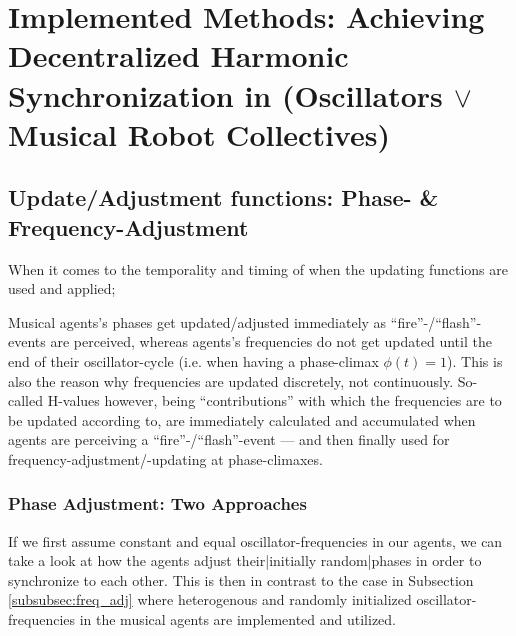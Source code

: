 	
\section{Implemented Methods: Achieving Decentralized Harmonic Synchronization in (Oscillators $\vee$ Musical Robot Collectives)}
\label{sec:methods}
	
	
	\subsection{Update/Adjustment functions: Phase- \& Frequency-Adjustment}
	\label{subsec:update_functions}
	
	When it comes to the temporality and timing of when the updating functions are used and applied;
	
	Musical agents's phases get updated/adjusted immediately as ``fire''-/``flash''-events are perceived, whereas agents's frequencies do not get updated until the end of their oscillator-cycle (i.e. when having a phase-climax $\phi(t)=1$). This is also the reason why frequencies are updated discretely, not continuously. So-called H-values however, being ``contributions'' with which the frequencies are to be updated according to, are immediately calculated and accumulated when agents are perceiving a ``fire''-/``flash''-event — and then finally used for frequency-adjustment/-updating at phase-climaxes.
	
	
	
	
	
	
	
	
	
		\subsubsection{Phase Adjustment: Two Approaches}
		\label{subsubsec:phase_adj}
			If we first assume constant and equal oscillator-frequencies in our agents, we can take a look at how the agents adjust their|initially random|phases in order to synchronize to each other. This is then in contrast to the case in Subsection \ref{subsubsec:freq_adj} where heterogenous and randomly initialized oscillator-frequencies in the musical agents are implemented and utilized.
			
